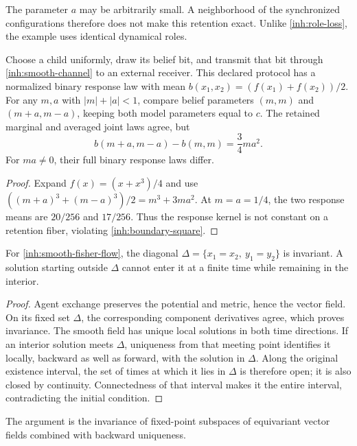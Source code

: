 The parameter $a$ may be arbitrarily small. A neighborhood of the
synchronized configurations therefore does not make this retention exact.
Unlike \cref{inh:role-loss}, the example uses identical dynamical roles.

Choose a child uniformly, draw its belief bit, and transmit that bit
through \cref{inh:smooth-channel} to an external receiver. This declared
protocol has a normalized binary response law with mean
$b(x_1,x_2)=(f(x_1)+f(x_2))/2$. For any $m,a$ with
$|m|+|a|<1$, compare belief parameters $(m,m)$ and $(m+a,m-a)$,
keeping both model parameters equal to $c$. The retained marginal and
averaged joint laws agree, but
\begin{equation}
 b(m+a,m-a)-b(m,m)=\frac34ma^2.
 \label{inh:smooth-boundary-defect}
\end{equation}
For $ma\ne0$, their full binary response laws differ.

\begin{proof}
Expand $f(x)=(x+x^3)/4$ and use
$((m+a)^3+(m-a)^3)/2=m^3+3ma^2$.
At $m=a=1/4$, the two response means are $20/256$ and $17/256$.
Thus the response kernel is not constant on a retention fiber, violating
\cref{inh:boundary-square}.
\end{proof}

For \cref{inh:smooth-fisher-flow}, the diagonal
$\Delta=\{x_1=x_2,\ y_1=y_2\}$ is invariant. A solution starting outside
$\Delta$ cannot enter it at a finite time while remaining in the interior.

\begin{proof}
Agent exchange preserves the potential and metric, hence the vector field.
On its fixed set $\Delta$, the corresponding component derivatives agree,
which proves invariance. The smooth field has unique local solutions in
both time directions. If an interior solution meets $\Delta$, uniqueness
from that meeting point identifies it locally, backward as well as
forward, with the solution in $\Delta$. Along the original existence
interval, the set of times at which it lies in $\Delta$ is therefore open;
it is also closed by continuity. Connectedness of that interval makes it
the entire interval, contradicting the initial condition.
\end{proof}

The argument is the invariance of fixed-point subspaces of equivariant
vector fields \citep{GolubitskyStewartSchaeffer1988} combined with backward
uniqueness.

